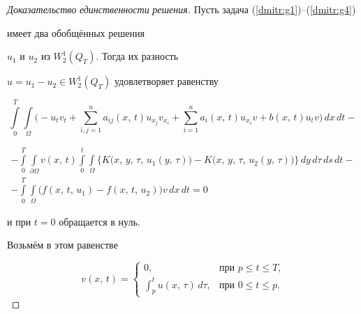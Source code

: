 \begin{proof}[Доказательство\,\,единственности\,\,решения] Пусть задача (\ref{dmitr:g1})--(\ref{dmitr:g4})


имеет два обобщённых решения


$u_1$ и $u_2$ из $W_{2}^{1}(Q_{T})$. Тогда их разность


 $u = u_1-u_2\in W_{2}^{1}(Q_{T})$ удовлетворяет равенству


$$


\int\limits_{0}^{T}\int\limits_{\Omega}\Biggl(-u_{t}v_{t}+


\sum\limits_{i,j=1}^n a_{ij}(x,\, t)u_{x_j}v_{x_i}


+\sum\limits_{i=1}^{n}a_i(x,\, t)u_{x_i}v +b(x,\,t)u_tv\Biggr)\,dx\,dt-$$


\begin{multline}


-\int\limits_{0}^{T}\int\limits_{\partial\Omega}v(x,\,t)


\int\limits_{0}^t \int\limits_{\Omega}


\biggl\{K\bigl(x,\, y,\, \tau,\, u_1(y,\, \tau)\bigr) -K\bigl(x,\, y,\, \tau,\, u_2(y,\, \tau)\bigr)\biggr\}\,dy\,d\tau\,ds\,dt-


\\


\label{dmitr:ge}


-\int\limits_{0}^{T}\int\limits_{\Omega}\bigl(f(x,\,t,\,u_1)-f(x,\,t,\,u_2)\bigr)v\,dx\,dt


=0


\end{multline}


и при $t=0$ обращается в нуль.


Возьмём в этом равенстве


\begin{equation}


\label{dmitr:g13}


v(x,\,t)=\left\{


\begin{array}{cl}


0, &\text{при $p\le t\le T$,}


\\


\displaystyle\int_p^{t}\!\!u(x,\,\tau)\,d\tau, &\text{при $0\le t\le p$.}


\end{array} \right.


\end{equation}






\end{proof}
